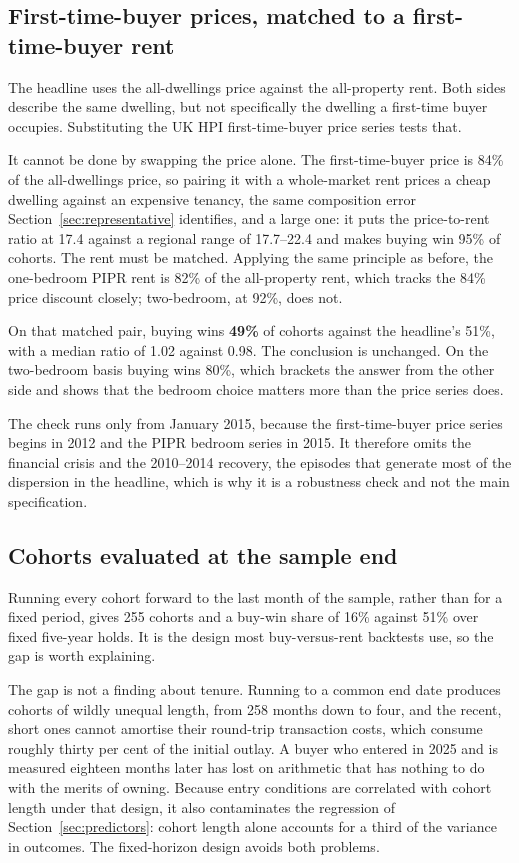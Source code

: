 \subsection{First-time-buyer prices, matched to a first-time-buyer rent}

The headline uses the all-dwellings price against the all-property rent. Both sides describe the same dwelling, but not specifically the dwelling a first-time buyer occupies. Substituting the UK HPI first-time-buyer price series tests that.

It cannot be done by swapping the price alone. The first-time-buyer price is 84\% of the all-dwellings price, so pairing it with a whole-market rent prices a cheap dwelling against an expensive tenancy, the same composition error Section~\ref{sec:representative} identifies, and a large one: it puts the price-to-rent ratio at 17.4 against a regional range of 17.7--22.4 and makes buying win 95\% of cohorts. The rent must be matched. Applying the same principle as before, the one-bedroom PIPR rent is 82\% of the all-property rent, which tracks the 84\% price discount closely; two-bedroom, at 92\%, does not.

On that matched pair, buying wins \textbf{49\%} of cohorts against the headline's 51\%, with a median ratio of 1.02 against 0.98. The conclusion is unchanged. On the two-bedroom basis buying wins 80\%, which brackets the answer from the other side and shows that the bedroom choice matters more than the price series does.

The check runs only from January 2015, because the first-time-buyer price series begins in 2012 and the PIPR bedroom series in 2015. It therefore omits the financial crisis and the 2010--2014 recovery, the episodes that generate most of the dispersion in the headline, which is why it is a robustness check and not the main specification.

\subsection{Cohorts evaluated at the sample end}

Running every cohort forward to the last month of the sample, rather than for a fixed period, gives 255 cohorts and a buy-win share of 16\% against 51\% over fixed five-year holds. It is the design most buy-versus-rent backtests use, so the gap is worth explaining.

The gap is not a finding about tenure. Running to a common end date produces cohorts of wildly unequal length, from 258 months down to four, and the recent, short ones cannot amortise their round-trip transaction costs, which consume roughly thirty per cent of the initial outlay. A buyer who entered in 2025 and is measured eighteen months later has lost on arithmetic that has nothing to do with the merits of owning. Because entry conditions are correlated with cohort length under that design, it also contaminates the regression of Section~\ref{sec:predictors}: cohort length alone accounts for a third of the variance in outcomes. The fixed-horizon design avoids both problems.

